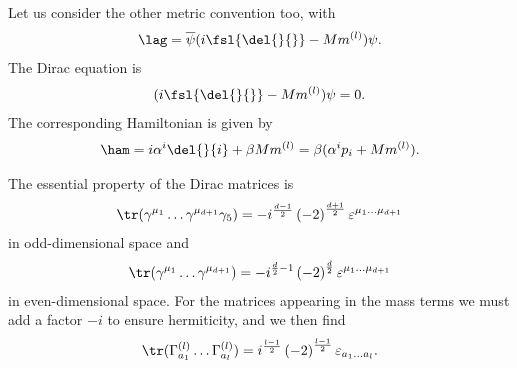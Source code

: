 Let us consider the other metric convention too, with
\begin{align*}
	\lag = \overline{\psi}(i\fsl{\del{}{}} - Mm^{(l)})\psi.
\end{align*}
The Dirac equation is
\begin{align*}
	(i\fsl{\del{}{}} - Mm^{(l)})\psi = 0.
\end{align*}
The corresponding Hamiltonian is given by
\begin{align*}
	\ham = i\alpha^{i}\del{}{i} + \beta Mm^{(l)} = \beta(\alpha^{i}p_{i} + Mm^{(l)}).
\end{align*}

The essential property of the Dirac matrices is
\begin{align*}
	\tr(\gamma^{\mu_{1}}\dots\gamma^{\mu_{d + 1}}\gamma_{5}) = -i^{\frac{d - 1}{2}}\left(-2\right)^{\frac{d + 1}{2}}\varepsilon^{\mu_{1}\dots\mu_{d + 1}}
\end{align*}
in odd-dimensional space and
\begin{align*}
	\tr(\gamma^{\mu_{1}}\dots\gamma^{\mu_{d + 1}}) =  -i^{\frac{d}{2} - 1}\left(-2\right)^{\frac{d}{2}}\varepsilon^{\mu_{1}\dots\mu_{d + 1}}
\end{align*}
in even-dimensional space. For the matrices appearing in the mass terms we must add a factor $-i$ to ensure hermiticity, and we then find
\begin{align*}
	\tr(\Gamma_{a_{1}}^{(l)}\dots\Gamma_{a_{l}}^{(l)}) =  i^{\frac{l - 1}{2}}\left(-2\right)^{\frac{l - 1}{2}}\varepsilon_{a_{1}\dots a_{l}}.
\end{align*}

